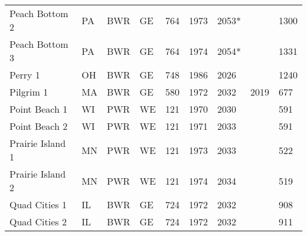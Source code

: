 \begin{table}[H]
\begin{tabular}{l l l l l l l l l}
    Peach Bottom 2      & PA & BWR & GE   & 764 & 1973 & 2053*&      & 1300\\
    Peach Bottom 3      & PA & BWR & GE   & 764 & 1974 & 2054*&      & 1331\\
    Perry 1             & OH & BWR & GE   & 748 & 1986 & 2026 &      & 1240\\
    Pilgrim 1           & MA & BWR & GE   & 580 & 1972 & 2032 & 2019 & 677 \\
    Point Beach 1       & WI & PWR & WE   & 121 & 1970 & 2030 &      & 591 \\
    Point Beach 2       & WI & PWR & WE   & 121 & 1971 & 2033 &      & 591 \\
    Prairie Island 1    & MN & PWR & WE   & 121 & 1973 & 2033 &      & 522 \\
    Prairie Island 2    & MN & PWR & WE   & 121 & 1974 & 2034 &      & 519 \\
    Quad Cities 1       & IL & BWR & GE   & 724 & 1972 & 2032 &      & 908 \\
    Quad Cities 2       & IL & BWR & GE   & 724 & 1972 & 2032 &      & 911 \\
    \hline
    \end{tabular}
\end{table}

